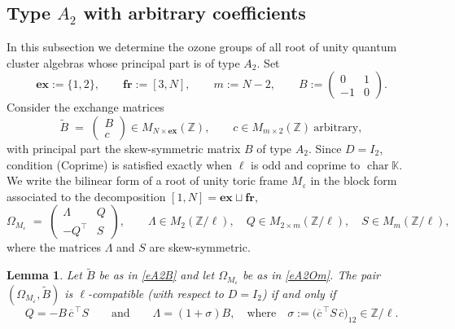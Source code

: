\documentclass[11pt]{amsart}
\theoremstyle{plain}
\newtheorem{lemma}[theorem]{Lemma}
\newcommand \ble[1] { \begin{lemma}\label{l#1} }
\newcommand {\ele} { \end{lemma} }
\def \KK {{\mathbb C}}
\def \KK {{\mathbb K}}
\def \Zset {{\mathbb Z}}
\newcommand \ex {{\mathbf{ex}}}
\newcommand \fr {{\mathbf{fr}}}
\def \ep {\varepsilon}
\DeclareMathOperator \charr { {\mathrm{char}} }
\begin{document}
\subsection{Type $A_2$ with arbitrary coefficients}
In this subsection we determine the ozone groups of all root of unity quantum cluster algebras whose principal part is of type $A_2$. Set
\[
\ex := \{1,2\}, \qquad \fr := [3,N], \qquad m := N-2,
\qquad
B := \begin{pmatrix} 0 & 1\\ -1 & 0 \end{pmatrix}.
\]
Consider the exchange matrices
\begin{equation}
\label{eA2B}
\widetilde{B} \; = \; \begin{pmatrix} B \\ c \end{pmatrix}
\in M_{N \times \ex}(\Zset),
\qquad c \in M_{m \times 2}(\Zset) \ \text{arbitrary},
\end{equation}
with principal part the skew-symmetric matrix $B$ of type $A_2$.
Since $D = I_2$, condition (Coprime) is satisfied exactly when $\ell$ is odd and coprime to $\charr \KK$. We write the bilinear form of a root of unity toric frame $M_\ep$ in the
block form associated to the decomposition $[1,N] = \ex \sqcup \fr$,
\begin{equation}
\label{eA2Om}
\Omega_{M_\ep} \; = \;
\begin{pmatrix} \Lambda & Q \\ -Q^{\top} & S \end{pmatrix},
\qquad
\Lambda \in M_2(\Zset/\ell), \quad
Q \in M_{2 \times m}(\Zset/\ell), \quad
S \in M_m(\Zset/\ell),
\end{equation}
where the matrices $\Lambda$ and $S$ are skew-symmetric.
\ble{A2compat}
Let $\widetilde{B}$ be as in \eqref{eA2B} and let $\Omega_{M_\ep}$ be as
in \eqref{eA2Om}. The pair $(\Omega_{M_\ep}, \widetilde{B})$ is
$\ell$-compatible (with respect to $D = I_2$) if and only if
\begin{equation}
\label{eA2compat}
Q = - B \, \overline{c}^{\,\top} S
\qquad\text{and}\qquad
\Lambda = (1+\sigma) B, \quad \text{where} \quad
\sigma := \bigl( \overline{c}^{\,\top} S \, \overline{c} \bigr)_{12} \in \Zset/\ell .
\end{equation}
\ele
\end{document}
